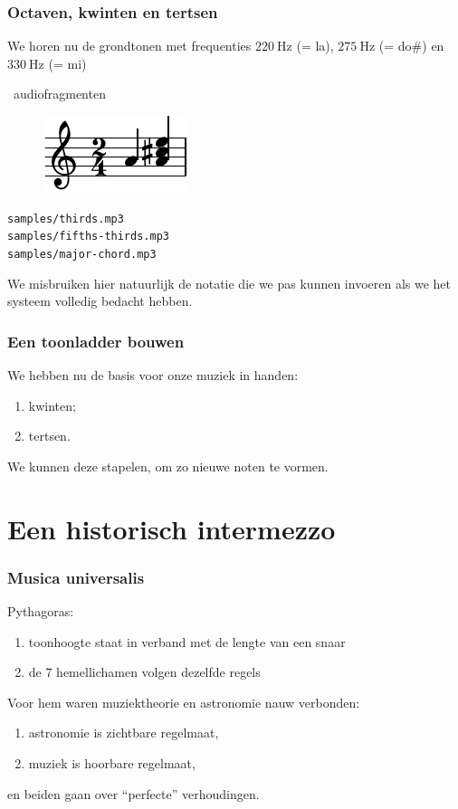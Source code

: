 \documentclass[compress, darktitle, framenumber, totalframenumber]{beamer}
\begin{document}
\begin{frame}
  \frametitle{Octaven, kwinten en tertsen}

  We horen nu de grondtonen met frequenties $\SI{220}{\hertz}$ (= la), $\SI{275}{\hertz}$ (= do\#) en $\SI{330}{\hertz}$ (= mi)
  \begin{block}{\twonotes\ audiofragmenten}
    \begin{figure}
      \vspace{-.5cm} %
      \centering
      \includegraphics{scores/major-chord-cropped}
    \end{figure}

    \texttt{samples/thirds.mp3} \\
    \texttt{samples/fifths-thirds.mp3} \\
    \texttt{samples/major-chord.mp3}
  \end{block}

  \pause

  We misbruiken hier natuurlijk de notatie die we pas kunnen invoeren als we het systeem volledig bedacht hebben.
\end{frame}

\begin{frame}
  \frametitle{Een toonladder bouwen}

  We hebben nu de basis voor onze muziek in handen:
  \begin{enumerate}
    \item kwinten;
    \item tertsen.
  \end{enumerate}
  We kunnen deze stapelen, om zo nieuwe noten te vormen.
\end{frame}


\section{Een historisch intermezzo}

\begin{frame}
  \frametitle{Musica universalis}

  Pythagoras:
  \begin{enumerate}
    \item toonhoogte staat in verband met de lengte van een snaar
    \item de 7 hemellichamen volgen dezelfde regels
  \end{enumerate}

  \pause
  Voor hem waren muziektheorie en astronomie nauw verbonden:
  \begin{enumerate}
    \item astronomie is \alert{zichtbare} regelmaat,
    \item muziek is \alert{hoorbare} regelmaat,
  \end{enumerate}
  en beiden gaan over \alert{``perfecte'' verhoudingen}.
\end{frame}
\end{document}
